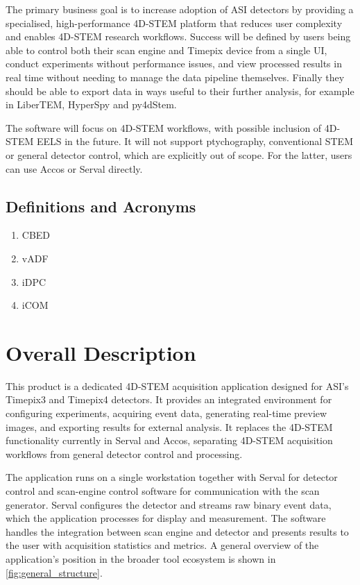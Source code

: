\documentclass[12pt]{article}
\begin{document}
The primary business goal is to increase adoption of ASI detectors by providing a specialised, high-performance 4D-STEM platform that reduces user complexity and enables 4D-STEM research workflows. Success will be defined by users being able to control both their scan engine and Timepix device from a single UI, conduct experiments without performance issues, and view processed results in real time without needing to manage the data pipeline themselves. Finally they should be able to export data in ways useful to their further analysis, for example in LiberTEM, HyperSpy and py4dStem.

The software will focus on 4D-STEM workflows, with possible inclusion of 4D-STEM EELS in the future. It will not support ptychography, conventional STEM or general detector control, which are explicitly out of scope. For the latter, users can use Accos or Serval directly.

\subsection{Definitions and Acronyms}
\begin{enumerate}
    \item CBED
    \item vADF
    \item iDPC
    \item iCOM
\end{enumerate}


\section{Overall Description}\label{sec:overall_description}
This product is a dedicated 4D-STEM acquisition application designed for ASI's Timepix3 and Timepix4 detectors. It provides an integrated environment for configuring experiments, acquiring event data, generating real-time preview images, and exporting results for external analysis. It replaces the 4D-STEM functionality currently in Serval and Accos, separating 4D-STEM acquisition workflows from general detector control and processing.

The application runs on a single workstation together with Serval for detector control and scan-engine control software for communication with the scan generator. Serval configures the detector and streams raw binary event data, which the application processes for display and measurement. The software handles the integration between scan engine and detector and presents results to the user with acquisition statistics and metrics. A general overview of the application’s position in the broader tool ecosystem is shown in \cref{fig:general_structure}.
\end{document}
